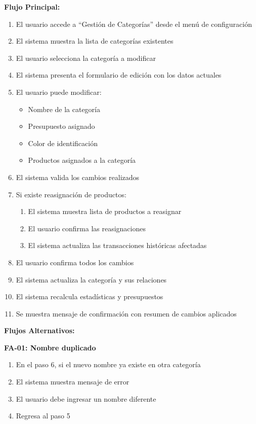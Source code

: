\noindent\textbf{Flujo Principal:}
\begin{enumerate}
    \item El usuario accede a ``Gestión de Categorías'' desde el menú de configuración
    \item El sistema muestra la lista de categorías existentes
    \item El usuario selecciona la categoría a modificar
    \item El sistema presenta el formulario de edición con los datos actuales
    \item El usuario puede modificar:
    \begin{itemize}
        \item Nombre de la categoría
        \item Presupuesto asignado
        \item Color de identificación
        \item Productos asignados a la categoría
    \end{itemize}
    \item El sistema valida los cambios realizados
    \item Si existe reasignación de productos:
    \begin{enumerate}
        \item El sistema muestra lista de productos a reasignar
        \item El usuario confirma las reasignaciones
        \item El sistema actualiza las transacciones históricas afectadas
    \end{enumerate}
    \item El usuario confirma todos los cambios
    \item El sistema actualiza la categoría y sus relaciones
    \item El sistema recalcula estadísticas y presupuestos
    \item Se muestra mensaje de confirmación con resumen de cambios aplicados
\end{enumerate}

\noindent\textbf{Flujos Alternativos:}

\textbf{FA-01: Nombre duplicado}
\begin{enumerate}
    \item En el paso 6, si el nuevo nombre ya existe en otra categoría
    \item El sistema muestra mensaje de error
    \item El usuario debe ingresar un nombre diferente
    \item Regresa al paso 5
\end{enumerate}

